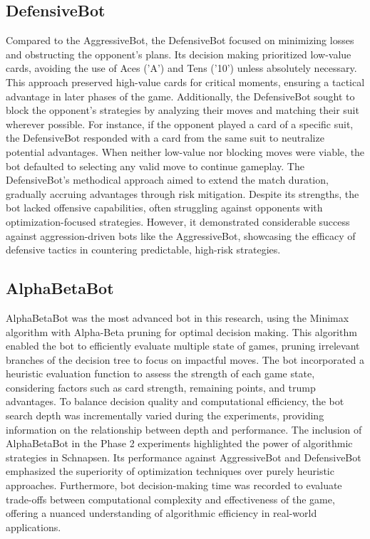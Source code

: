\documentclass[runningheads]{llncs}
\begin{document}
\subsection{DefensiveBot}
Compared to the AggressiveBot, the DefensiveBot focused on minimizing losses and obstructing the opponent’s plans. Its decision making prioritized low-value cards, avoiding the use of Aces ('A') and Tens ('10') unless absolutely necessary. This approach preserved high-value cards for critical moments, ensuring a tactical advantage in later phases of the game. Additionally, the DefensiveBot sought to block the opponent’s strategies by analyzing their moves and matching their suit wherever possible. For instance, if the opponent played a card of a specific suit, the DefensiveBot responded with a card from the same suit to neutralize potential advantages.
 When neither low-value nor blocking moves were viable, the bot defaulted to selecting any valid move to continue gameplay. The DefensiveBot’s methodical approach aimed to extend the match duration, gradually accruing advantages through risk mitigation. Despite its strengths, the bot lacked offensive capabilities, often struggling against opponents with optimization-focused strategies. However, it demonstrated considerable success against aggression-driven bots like the AggressiveBot, showcasing the efficacy of defensive tactics in countering predictable, high-risk strategies.

\subsection{AlphaBetaBot}
AlphaBetaBot was the most advanced bot in this research, using the Minimax algorithm with Alpha-Beta pruning \cite{ref_pruning_optimize} for optimal decision making. This algorithm enabled the bot to efficiently evaluate multiple state of games, pruning irrelevant branches of the decision tree to focus on impactful moves. The bot incorporated a heuristic evaluation function to assess the strength of each game state, considering factors such as card strength, remaining points, and trump advantages. To balance decision quality and computational efficiency, the bot search depth was incrementally varied during the experiments, providing information on the relationship between depth and performance.
 The inclusion of AlphaBetaBot in the Phase 2 experiments highlighted the power of algorithmic strategies in Schnapsen. Its performance against AggressiveBot and DefensiveBot emphasized the superiority of optimization techniques over purely heuristic approaches. Furthermore, bot decision-making time was recorded to evaluate trade-offs between computational complexity and effectiveness of the game, offering a nuanced understanding of algorithmic efficiency in real-world applications.
\end{document}
